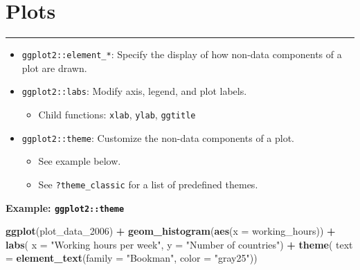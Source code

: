 \documentclass[
]{book}
\newenvironment{Shaded}{\begin{snugshade}}{\end{snugshade}}
\newcommand{\DataTypeTok}[1]{\textcolor[rgb]{0.13,0.29,0.53}{#1}}
\newcommand{\DecValTok}[1]{\textcolor[rgb]{0.00,0.00,0.81}{#1}}
\newcommand{\KeywordTok}[1]{\textcolor[rgb]{0.13,0.29,0.53}{\textbf{#1}}}
\newcommand{\NormalTok}[1]{#1}
\newcommand{\OperatorTok}[1]{\textcolor[rgb]{0.81,0.36,0.00}{\textbf{#1}}}
\newcommand{\StringTok}[1]{\textcolor[rgb]{0.31,0.60,0.02}{#1}}
\providecommand{\tightlist}{%
  \setlength{\itemsep}{0pt}\setlength{\parskip}{0pt}}
\begin{document}
\hypertarget{plots}{%
\section{Plots}\label{plots}}

\begin{center}\rule{0.5\linewidth}{0.5pt}\end{center}

\begin{itemize}
\tightlist
\item
  \texttt{ggplot2::element\_*}: Specify the display of how non-data components of a plot are drawn.
\item
  \texttt{ggplot2::labs}: Modify axis, legend, and plot labels.

  \begin{itemize}
  \tightlist
  \item
    Child functions: \texttt{xlab}, \texttt{ylab}, \texttt{ggtitle}
  \end{itemize}
\item
  \texttt{ggplot2::theme}: Customize the non-data components of a plot.

  \begin{itemize}
  \tightlist
  \item
    See example below.
  \item
    See \texttt{?theme\_classic} for a list of predefined themes.
  \end{itemize}
\end{itemize}

\textbf{Example: \texttt{ggplot2::theme}}

\begin{Shaded}
\begin{Highlighting}[]
\KeywordTok{ggplot}\NormalTok{(plot_data_}\DecValTok{2006}\NormalTok{) }\OperatorTok{+}
\StringTok{  }\KeywordTok{geom_histogram}\NormalTok{(}\KeywordTok{aes}\NormalTok{(}\DataTypeTok{x =}\NormalTok{ working_hours)) }\OperatorTok{+}
\StringTok{  }\KeywordTok{labs}\NormalTok{(}
    \DataTypeTok{x =} \StringTok{"Working hours per week"}\NormalTok{,}
    \DataTypeTok{y =} \StringTok{"Number of countries"}\NormalTok{) }\OperatorTok{+}
\StringTok{  }\KeywordTok{theme}\NormalTok{(}
    \DataTypeTok{text =} \KeywordTok{element_text}\NormalTok{(}\DataTypeTok{family =} \StringTok{"Bookman"}\NormalTok{, }\DataTypeTok{color =} \StringTok{"gray25"}\NormalTok{))}
\end{Highlighting}
\end{Shaded}
\end{document}
